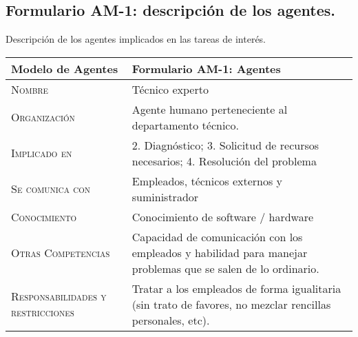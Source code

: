 \documentclass[12pt,a4paper,twoside,spanish]{article}      %
\begin{document}
\subsection{Formulario AM-1: descripción de los agentes.}

Descripción de los agentes implicados en las tareas de interés.

\begin{table}[H]
\scriptsize
\begin{tabularx}{\textwidth}{|l|X|} \hline
\textbf{Modelo de Agentes} & \textbf{Formulario AM-1: Agentes} \\ \hline\hline
\textsc{Nombre} 
&  Técnico experto
\\ \hline
\textsc{Organización} 
&  Agente humano perteneciente al departamento técnico.
\\ \hline
\textsc{Implicado en} & 2. Diagnóstico; 3. Solicitud de recursos necesarios; 4. Resolución del problema
 \\ \hline
\textsc{Se comunica con} & Empleados, técnicos externos y suministrador  \\ \hline
\textsc{Conocimiento} & Conocimiento de software / hardware \\ \hline
\textsc{Otras Competencias} 
& Capacidad de comunicación con los empleados y habilidad para manejar problemas que se salen de lo ordinario.
\\ \hline
\textsc{Responsabilidades y restricciones} &  Tratar a los empleados de forma igualitaria (sin trato de favores, no mezclar rencillas personales, etc).
\\ \hline
\end{tabularx}
 \label{tab.AM1}
\end{table}

\end{document}
